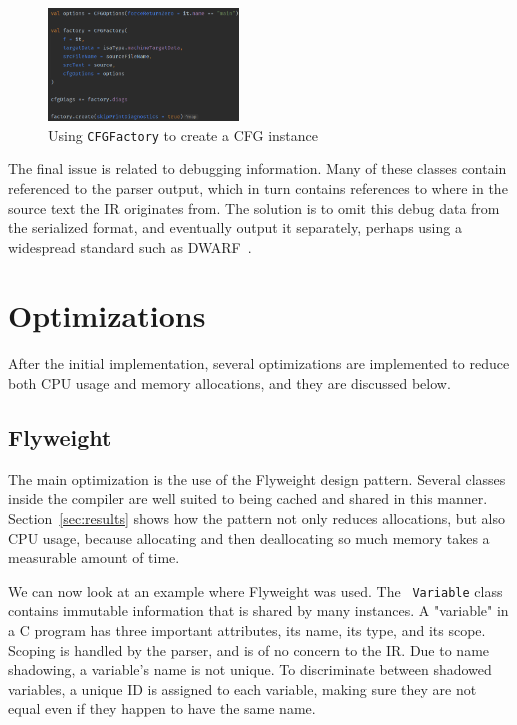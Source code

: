 \documentclass[lettersize,journal]{IEEEtran}
\begin{document}
    \begin{figure}[th]
        \centering
        \includegraphics[width=0.45\textwidth]{pics/cfgfactory}
        \caption{Using \texttt{CFGFactory} to create a CFG instance}
        \label{fig:cfg-factory-create}
    \end{figure}

    The final issue is related to debugging information.
    Many of these classes contain referenced to the parser output, which in turn contains references to where in the
    source text the IR originates from.
    The solution is to omit this debug data from the serialized format, and eventually output it separately,
    perhaps using a widespread standard such as DWARF~\cite{dwarf-standard}.

    \section{Optimizations}\label{sub:optimizations}

    After the initial implementation, several optimizations are implemented to reduce both CPU usage and memory
    allocations, and they are discussed below.

    \subsection{Flyweight}\label{subsec:flyweight}

    The main optimization is the use of the Flyweight design pattern.
    Several classes inside the compiler are well suited to being cached and shared in this manner.
    Section~\ref{sec:results} shows how the pattern not only reduces allocations, but also CPU usage, because allocating
    and then deallocating so much memory takes a measurable amount of time.

    We can now look at an example where Flyweight was used.
    The ~\texttt{Variable} class contains immutable information that is shared by many instances.
    A "variable" in a C program has three important attributes, its name, its type, and its scope.
    Scoping is handled by the parser, and is of no concern to the IR\@.
    Due to name shadowing, a variable's name is not unique.
    To discriminate between shadowed variables, a unique ID is assigned to each variable, making sure they are not equal
    even if they happen to have the same name.
\end{document}
